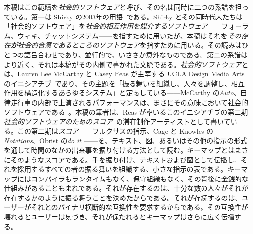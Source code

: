 \documentclass[10pt,letterpaper,twocolumn]{article}
\begin{document}
本稿はこの範疇を\emph{社会的ソフトウェア}と呼び、その名は同時に二つの系譜を担っている。第一は Shirky の2003年の用語~\citep{shirky2003etech,allen2004socialsoftware}である。Shirky とその同時代人たちは「社会的ソフトウェア」を\emph{社会的相互作用を媒介するソフトウェア}——フォーラム、ウィキ、チャットシステム——を指すために用いたが、本稿はそれを\emph{その存在\textbf{が}社会的合意であるところのソフトウェア}を指すために用いる。その読みはひとつの語呂合わせであり、並行的で、いささか意外なものである。第二の系譜はより近く、それは本稿がその内側で書かれた文脈である。\emph{社会的ソフトウェア}とは、Lauren Lee McCarthy と Casey Reas が主宰する UCLA Design\,\textbar\,Media Arts のイニシアチブ~\citep{sosoft_info}であり、その主題を「振る舞いを組織し、人々を調整し、相互作用を構造化するあらゆるシステム」と定義している——McCarthy の\emph{Auto}、自律走行車の内部で上演されるパフォーマンスは、まさにその意味において社会的ソフトウェアである~\citep{mccarthy2026auto}。本稿の筆者は、Reas が率いるこのイニシアチブの第二期\emph{社会的ソフトウェアのためのスコア}~\citep{reas2026scores}の滞在制作アーティストとして書いている。この第二期は\emph{スコア}——フルクサスの指示、Cage と Knowles の\emph{Notations}、Obrist の\emph{do it}~\citep{cage1969notations,obrist1997doit}——を、テキスト、図、あるいはその他の指示の形式を通して時間のなかの出来事を振り付ける方法として読む。キーマップとはまさにそのようなスコアである。手を振り付け、テキストおよび図として伝播し、それを採用するすべての者の振る舞いを組織する、小さな指示の表である。キーマップにはコンパイラもランタイムもなく、保守組織もなく、その背後に金銭的な仕組みがあることもまれである。それが存在するのは、十分な数の人々がそれが存在するかのように振る舞うことを決めたからである。それが存続するのは、ユーザーがそれとのバイナリ横断的な互換性を要求するからである。その互換性が壊れるとユーザーは気づき、それが保たれるとキーマップはさらに広く伝播する。
\end{document}
